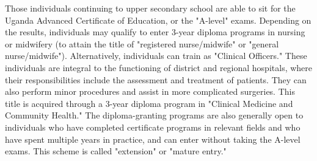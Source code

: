 \documentclass[12pt]{article} %
\begin{document}
Those individuals continuing to upper secondary school are able to sit for the Uganda Advanced Certificate of Education, or the "A-level" exams. Depending on the results, individuals may qualify to enter 3-year diploma programs in nursing or midwifery (to attain the title of "registered nurse/midwife" or "general nurse/midwife").
 \citet{Klopper2012-pp}
Alternatively, individuals can train as "Clinical Officers." These individuals are integral to the functioning of district and regional hospitals, where their responsibilities include the assessment and treatment of patients. They can also perform minor procedures and assist in more complicated surgeries. This title is acquired through a 3-year diploma program in "Clinical Medicine and Community Health." 
\citet{Banerjee2005Mar}
The diploma-granting programs are also generally open to individuals who have completed certificate programs in relevant fields and who have spent multiple years in practice, and can enter without taking the A-level exams. This scheme is called "extension" or "mature entry."
\end{document}
